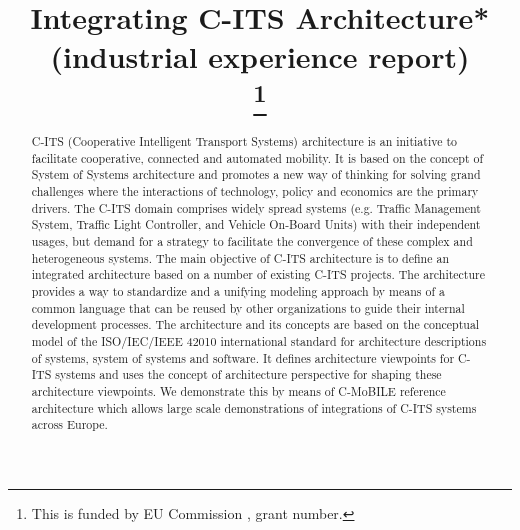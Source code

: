 \documentclass[conference]{IEEEtran}
\begin{document}
\title{Integrating C-ITS Architecture* (industrial experience report)\\
\thanks{This is funded by EU Commission , grant number.}
}

\author{
\and
{}
\and
{}
}

\maketitle

\begin{abstract}
C-ITS (Cooperative Intelligent Transport Systems) architecture  is an initiative to facilitate cooperative, connected and automated mobility. It is based on the concept of System of Systems architecture and promotes a new way of thinking for solving grand challenges where the interactions of technology, policy and economics are the primary drivers. The C-ITS domain comprises widely spread systems (e.g. Traffic Management System, Traffic Light Controller, and Vehicle On-Board Units) with their independent usages, but demand for a strategy to facilitate the convergence of these complex and heterogeneous systems. The main objective of C-ITS architecture is to define an integrated architecture based on a number of existing C-ITS projects. The architecture provides a way to standardize and a unifying modeling approach by means of a common language that can be reused by other organizations to guide their internal development processes. The architecture and its concepts are based on the conceptual model of the ISO/IEC/IEEE 42010 international standard for architecture descriptions of systems, system of systems and software. It defines architecture viewpoints for C-ITS systems and uses the concept of architecture perspective for shaping these architecture viewpoints. We demonstrate this by means of C-MoBILE reference architecture which allows large scale demonstrations of integrations of C-ITS systems across Europe.
\end{abstract}
\end{document}
